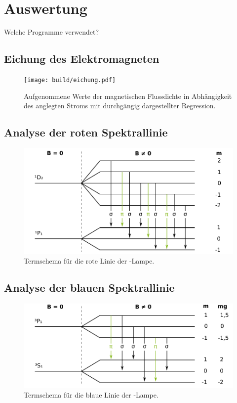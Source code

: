 \newpage
\section{Auswertung}
\label{sec:Auswertung}

Welche Programme verwendet?

\subsection{Eichung des Elektromagneten}
\label{sec:AuswEichung}



\begin{figure}
	\centering
	\texttt{[image: build/eichung.pdf]}
	\caption{Aufgenommene Werte der magnetischen Flussdichte in Abhängigkeit des
	anglegten Stroms mit durchgängig dargestellter Regression.}
	\label{fig:eichung}
\end{figure}


\subsection{Analyse der roten Spektrallinie}
\label{sec:AuswRot}



\begin{figure}
	\centering
	\includegraphics{images/termschema-rot.pdf}
	\caption{Termschema für die rote Linie der -Lampe.}
	\label{fig:termschema-rot}
\end{figure}


\subsection{Analyse der blauen Spektrallinie}
\label{sec:AuswBlau}




\begin{figure}
	\centering
	\includegraphics{images/termschema-blau.pdf}
	\caption{Termschema für die blaue Linie der -Lampe.}
	\label{fig:termschema-blau}
\end{figure}
